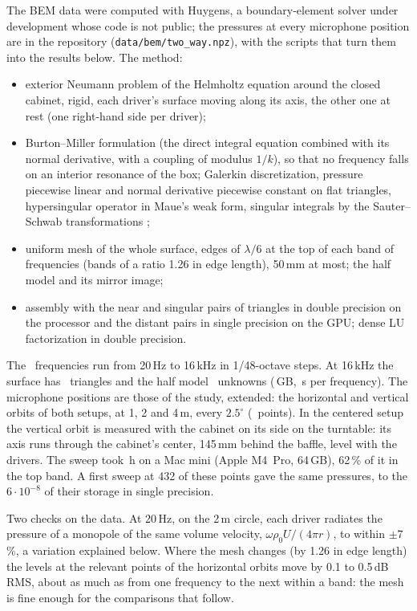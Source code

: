 \documentclass[11pt,a4paper]{article}
\begin{document}
The BEM data were computed with Huygens, a boundary-element solver under development whose code is not
public; the pressures at every microphone position are in the repository
(\texttt{data/bem/two\_way.npz}), with the scripts that turn them into the results below. The method:
\begin{itemize}
  \item exterior Neumann problem of the Helmholtz equation around the closed cabinet, rigid, each
  driver's surface moving along its axis, the other one at rest (one right-hand side per driver);
  \item Burton--Miller formulation \cite{burtonmiller} (the direct integral equation combined with its
  normal derivative, with a coupling of modulus $1/k$), so that no
  frequency falls on an interior resonance of the box; Galerkin discretization, pressure piecewise
  linear and normal derivative piecewise constant on flat triangles, hypersingular operator in Maue's
  weak form, singular integrals by the Sauter--Schwab transformations \cite{sauter};
  \item uniform mesh of the whole surface, edges of $\lambda/6$ at the top of each band of frequencies
  (bands of a ratio 1.26 in edge length), 50\,mm at most; the half model and its mirror image;
  \item assembly with the near and singular pairs of triangles in double precision on the processor and
  the distant pairs in single precision on the GPU; dense LU factorization in double precision.
\end{itemize}
The \bemFreqs\ frequencies run from 20\,Hz to 16\,kHz in 1/48-octave steps. At 16\,kHz the surface has
\bemTrianglesMax\ triangles and the half model \bemUnknownsMax\ unknowns (\bemGigabytesMax\,GB,
\bemSecondsTop\,s per frequency). The microphone positions are those of the study, extended: the
horizontal and vertical orbits of both setups, at 1, 2 and 4\,m, every $2.5^\circ$ (\bemPoints\ points).
In the centered setup the vertical orbit is measured with the cabinet on its side on the turntable: its
axis runs through the cabinet's center, 145\,mm behind the baffle, level with the drivers. The sweep took
\bemHours\,h on a Mac mini (Apple M4~Pro, 64\,GB), 62\,\% of it in the top band. A first sweep at 432 of
these points gave the same pressures, to the $6\cdot10^{-8}$ of their storage in single precision.

Two checks on the data. At 20\,Hz, on the 2\,m circle, each driver radiates the pressure of a monopole
of the same volume velocity, $\omega\rho_0 U/(4\pi r)$, to within $\pm7$\,\%, a variation explained below.
Where the mesh changes (by 1.26 in edge length) the levels at the relevant points of the horizontal
orbits move by 0.1 to 0.5\,dB RMS, about as much as from one frequency to the next within a band: the
mesh is fine enough for the comparisons that follow.
\end{document}

